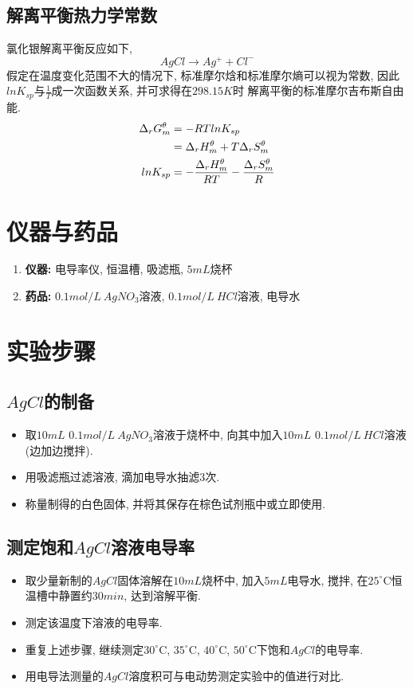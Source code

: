 \documentclass[a4paper]{article}
\begin{document}
\subsection{解离平衡热力学常数}
氯化银解离平衡反应如下, 
\begin{equation}
	AgCl \to Ag^{+} + Cl^{-}
\end{equation}
假定在温度变化范围不大的情况下, 标准摩尔焓和标准摩尔熵可以视为常数, 
因此$lnK_{sp}$与$\frac{1}{T}$成一次函数关系, 并可求得在$298.15K$时
解离平衡的标准摩尔吉布斯自由能.
\begin{equation}
	\centering
	\begin{aligned}
		\Delta_{r}G_{m}^{\theta} &= -RTlnK_{sp}\\
		&=\Delta_{r}H_{m}^{\theta} + T\Delta_{r}S_{m}^{\theta}\\
		lnK_{sp} &= -\frac{\Delta_{r}H_{m}^{\theta}}{RT} - \frac{\Delta_{r}S_{m}^{\theta}}{R}\\
	\end{aligned}
\end{equation}
\section{仪器与药品}
\begin{enumerate}
    \item \textbf{仪器:} 电导率仪, 恒温槽, 吸滤瓶, $5mL$烧杯
    \item \textbf{药品:} $0.1mol/L~AgNO_{3}$溶液, $0.1mol/L~HCl$溶液, 电导水
\end{enumerate}
\section{实验步骤}
\subsection{$AgCl$的制备}
\begin{itemize}
	\item 取$10mL$ $0.1mol/L~AgNO_{3}$溶液于烧杯中, 
	向其中加入$10mL$ $0.1mol/L~HCl$溶液(边加边搅拌).
	\item 用吸滤瓶过滤溶液, 滴加电导水抽滤3次. 
	\item 称量制得的白色固体, 并将其保存在棕色试剂瓶中或立即使用.
\end{itemize}
\subsection{测定饱和$AgCl$溶液电导率}
\begin{itemize}
	\item 取少量新制的$AgCl$固体溶解在$10mL$烧杯中, 加入$5mL$电导水, 
	搅拌, 在$25^\circ$C恒温槽中静置约$30min$, 达到溶解平衡.
	\item 测定该温度下溶液的电导率. 
	\item 重复上述步骤, 继续测定$30^\circ$C, $35^\circ$C, $40^\circ$C, 
	$50^\circ$C下饱和$AgCl$的电导率.
	\item 用电导法测量的$AgCl$溶度积可与电动势测定实验中的值进行对比.
\end{itemize}
\newpage
\end{document}
